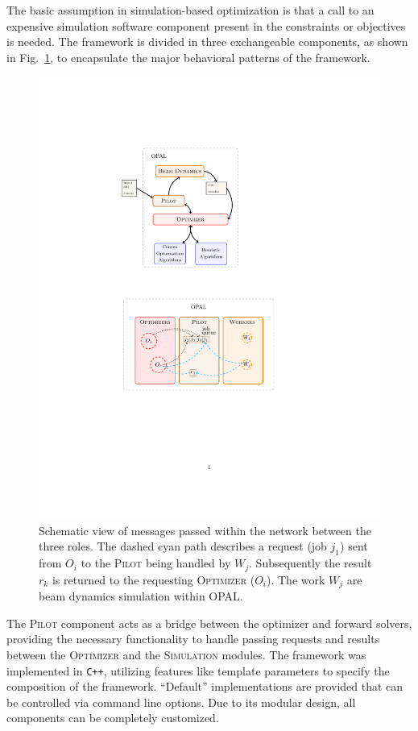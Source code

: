 \documentclass[preprint,linenumbers,amsmath,amssymb,aps,prstab]{revtex4-1}%
\begin{document}
The basic assumption in simulation-based optimization is that a
  call to an expensive simulation software component present in the
  constraints or objectives is needed.
The framework is divided in three exchangeable components, as shown in
  Fig.~\ref{fig:opt-framework-layout}, to encapsulate the major behavioral
  patterns of the framework.
%
\begin{figure}
  \centering
  \includegraphics[width=0.7\linewidth]{opt-framework-layout}
  \caption{Schematic view of messages passed within the network between the
    three roles.
  The dashed cyan path describes a request (job $j_1$) sent from $O_i$ to the
  \textsc{Pilot} being handled by $W_j$. Subsequently the result $r_k$ is
  returned to the requesting \textsc{Optimizer} ($O_i$). The work $W_j$ are beam dynamics 
  simulation within OPAL.}
  \label{fig:opt-framework-layout}
\end{figure}

%
The \textsc{Pilot} component acts as a bridge between the optimizer and
  forward solvers, providing the necessary functionality to handle passing
  requests and results between the \textsc{Optimizer} and the
  \textsc{Simulation} modules.
The framework was implemented in \texttt{C++}, utilizing features like template
parameters to specify the composition of the framework.
``Default'' implementations are provided that can be controlled via command line options.
Due to its modular design, all components can be completely customized.
\end{document}
